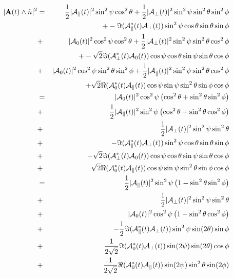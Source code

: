 \documentclass[a4paper,9pt,twosided]{article}
\begin{document}
\begin{eqnarray}
\label{arr:bigarray}
  |{ \bf A}(t) \wedge \hat{n}|^2 &=& 
                                  \frac{1}{2} |{\cal A}_\parallel(t)|^2 \sin^2\psi \cos^2\theta  +  \frac{1 }{2}|{\cal A}_\perp(t)|^2\sin^2\psi\sin^2\theta\sin^2\phi  \\
                              &&+     -\Im({\cal A}_\parallel^*(t){\cal A}_\perp(t))\sin^2\psi\cos\theta\sin\theta\sin\phi  \\
                              &+&     |{\cal A}_0(t)|^2 \cos^2\psi\cos^2\theta  + \frac{1}{2} |{\cal A}_\perp(t)|^2\sin^2\psi \sin^2\theta\cos^2\phi \\
                              &&+     -\sqrt{2}\Im({\cal A}_\perp^*(t) {\cal A}_0(t) )\cos\psi\cos\theta\sin\psi\sin\theta\cos\phi \\
                              &+&     |{\cal A}_0(t)|^2 \cos^2\psi\sin^2\theta\sin^2\phi  + \frac{1}{2}{|\cal A}_\parallel(t)|^2 \sin^2\psi \sin^2\theta\cos^2\phi       \\
                              &&+     \sqrt{2}\Re({\cal A}_0^*(t){\cal A}_\parallel(t)  )\cos\psi\sin\psi\sin^2\theta\sin\phi\cos\phi\\
                              &=&  |{\cal A}_0(t)|^2 \cos^2\psi\left( \cos^2\theta  +  \sin^2\theta\sin^2\phi\right) \\
                              &+& \frac{1}{2}|{\cal A}_\parallel(t)|^2 \sin^2\psi \left( \cos^2\theta + \sin^2\theta\cos^2\phi    \right)  \\
                              &+&\frac{1}{2}|{\cal A}_\perp(t)|^2\sin^2\psi\sin^2\theta \\
                              &+&     -\Im({\cal A}_\parallel^*(t){\cal A}_\perp(t))\sin^2\psi\cos\theta\sin\theta\sin\phi  \\
                              &+&     -\sqrt{2}\Im({\cal A}_\perp^*(t) {\cal A}_0(t) )\cos\psi\cos\theta\sin\psi\sin\theta\cos\phi \\
                              &+&     \sqrt{2}\Re({\cal A}_0^*(t){\cal A}_\parallel(t)  )\cos\psi\sin\psi\sin^2\theta\sin\phi\cos\phi\\
                              &=&\frac{1}{2}|{\cal A}_\parallel(t)|^2 \sin^2\psi \left( 1 -  \sin^2\theta\sin^2\phi    \right)  \\
                              &+&\frac{1}{2}|{\cal A}_\perp(t)|^2\sin^2\psi\sin^2\theta \\
                              &+&   |{\cal A}_0(t)|^2 \cos^2\psi\left( 1  -  \sin^2\theta\cos^2\phi\right) \\
                              &+&     -\frac{1}{2}\Im({\cal A}_\parallel^*(t){\cal A}_\perp(t))\sin^2\psi\sin(2\theta)\sin\phi  \\
                              &+&     \frac{1}{2\sqrt{2}}\Im({\cal A}_0^*(t) {\cal A}_\perp(t) ) \sin(2\psi)\sin(2\theta)\cos\phi \\
                              &+&     \frac{1}{2\sqrt{2}}\Re({\cal A}_0^*(t) {\cal A}_\parallel(t))\sin(2\psi)\sin^2\theta\sin(2\phi)
\end{eqnarray}
\end{document}

